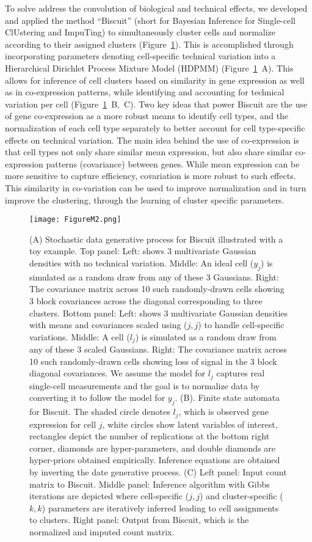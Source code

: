 To solve address the convolution of biological and technical effects, we developed and applied the method ``Biscuit'' (short for Bayesian Inference for Single-cell ClUstering and ImpuTing) to simultaneously cluster cells and normalize according to their assigned clusters \citep{Prabhakaran2016} (Figure~\ref{fig:m2}).
This is accomplished through incorporating parameters denoting cell-specific technical variation into a Hierarchical Dirichlet Process Mixture Model (HDPMM) \citep{Goeruer2010} (Figure~\ref{fig:m2}~A). 
This allows for inference of cell clusters based on similarity in gene expression as well as in co-expression patterns, while identifying and accounting for technical variation per cell (Figure~\ref{fig:m2}~B,~C). 
Two key ideas that power Biscuit are the use of gene co-expression as a more robust means to identify cell types, and the normalization of each cell type separately to better account for cell type-specific effects on technical variation. 
The main idea behind the use of co-expression is that cell types not only share similar mean expression, but also share similar co-expression patterns (covariance) between genes. 
While mean expression can be more sensitive to capture efficiency, covariation is more robust to such effects. 
This similarity in co-variation can be used to improve normalization and in turn improve the clustering, through the learning of cluster specific parameters.

\begin{figure}
\centering
\texttt{[image: FigureM2.png]}
\caption{(A) Stochastic data generative process for Biscuit illustrated with a toy example. Top panel: Left: shows 3 multivariate Gaussian densities with no technical variation. Middle: An ideal cell ($y_j$) is simulated as a random draw from any of these 3 Gaussians. Right: The covariance matrix across 10 such randomly-drawn cells showing 3 block covariances across the diagonal corresponding to three clusters.  
  Bottom panel: Left: shows 3 multivariate Gaussian densities with means and covariances scaled using ($j, j$) to handle cell-specific variations. 
  Middle: A cell ($l_j$) is simulated as a random draw from any of these 3 scaled Gaussians. 
  Right: The covariance matrix across 10 such randomly-drawn cells showing loss of signal in the 3 block diagonal covariances. 
  We assume the model for $l_j$ captures real single-cell measurements and the goal is to normalize data by converting it to follow the model for $y_j$. 
(B). Finite state automata for Biscuit. 
The shaded circle denotes $l_j$, which is observed gene expression for cell $j$, white circles show latent variables of interest, rectangles depict the number of replications at the bottom right corner, diamonds are hyper-parameters, and double diamonds are hyper-priors obtained empirically. Inference equations are obtained by inverting the date generative process. 
(C) Left panel: Input count matrix to Biscuit. Middle panel: Inference algorithm with Gibbs iterations are depicted where cell-specific ($j, j$) and cluster-specific ($k, k$) parameters are iteratively inferred leading to cell assignments to clusters. Right panel: Output from Biscuit, which is the normalized and imputed count matrix.
}
\label{fig:m2}
\end{figure}

